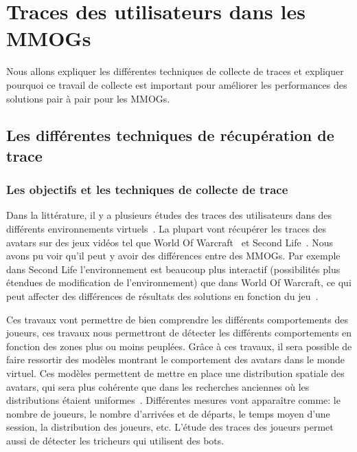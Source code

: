 \newpage
\section{Traces des utilisateurs dans les MMOGs}
	\label{trace}
	Nous allons expliquer les différentes techniques de collecte de traces et expliquer pourquoi ce travail de collecte est important pour améliorer les performances des solutions pair à pair pour les MMOGs.
	\subsection{Les différentes techniques de récupération de trace}
		\subsubsection{Les objectifs et les techniques de collecte de trace}
		\par Dans la littérature, il y a plusieurs études des traces des utilisateurs dans des différents environnements virtuels~\cite{1326262,0295-5075-88-4-48007}. La plupart vont récupérer les traces des avatars sur des jeux vidéos tel que World Of Warcraft~\cite{wow} et Second Life~\cite{sl}. Nous avons pu voir qu'il peut y avoir des différences entre des MMOGs. Par exemple dans Second Life l'environnement est beaucoup plus interactif (possibilités plus étendues de modification de l'environnement) que dans World Of Warcraft, ce qui peut affecter des différences de résultats des solutions en fonction du jeu~\cite{DBLP:journals/corr/abs-0807-2328,1613041}. \\
\par Ces travaux vont permettre de bien comprendre les différents comportements des joueurs, ces travaux nous permettront de détecter les différents comportements en fonction des zones plus ou moins peuplées. Grâce à ces travaux, il sera possible de faire ressortir des modèles montrant le comportement des avatars dans le monde virtuel. Ces modèles permettent de mettre en place une distribution spatiale des avatars, qui sera plus cohérente que dans les recherches anciennes où les distributions étaient uniformes~\cite{Knutsson04peer-to-peersupport}. Différentes mesures vont apparaître comme: le nombre de joueurs, le nombre d'arrivées et de départs, le temps moyen d'une session, la distribution des joueurs, etc. L'étude des traces des joueurs permet aussi de détecter les tricheurs qui utilisent des bots. \\
